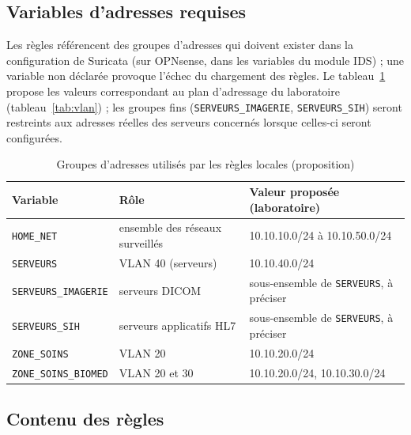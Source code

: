 \subsection{Variables d'adresses requises}

Les règles référencent des groupes d'adresses qui doivent exister dans la configuration de Suricata (sur OPNsense, dans les variables du module IDS) ; une variable non déclarée provoque l'échec du chargement des règles. Le tableau~\ref{tab:variables} propose les valeurs correspondant au plan d'adressage du laboratoire (tableau~\ref{tab:vlan}) ; les groupes fins (\texttt{SERVEURS\_IMAGERIE}, \texttt{SERVEURS\_SIH}) seront restreints aux adresses réelles des serveurs concernés lorsque celles-ci seront configurées.

\begin{table}[htbp]
\centering
\small
\begin{tabularx}{\textwidth}{llX}
\hline
\textbf{Variable} & \textbf{Rôle} & \textbf{Valeur proposée (laboratoire)} \\
\hline
\texttt{HOME\_NET} & ensemble des réseaux surveillés & 10.10.10.0/24 à 10.10.50.0/24 \\
\texttt{SERVEURS} & VLAN 40 (serveurs) & 10.10.40.0/24 \\
\texttt{SERVEURS\_IMAGERIE} & serveurs DICOM & sous-ensemble de \texttt{SERVEURS}, à préciser \\
\texttt{SERVEURS\_SIH} & serveurs applicatifs HL7 & sous-ensemble de \texttt{SERVEURS}, à préciser \\
\texttt{ZONE\_SOINS} & VLAN 20 & 10.10.20.0/24 \\
\texttt{ZONE\_SOINS\_BIOMED} & VLAN 20 et 30 & 10.10.20.0/24, 10.10.30.0/24 \\
\hline
\end{tabularx}
\caption{Groupes d'adresses utilisés par les règles locales (proposition)}
\label{tab:variables}
\end{table}

\subsection{Contenu des règles}

